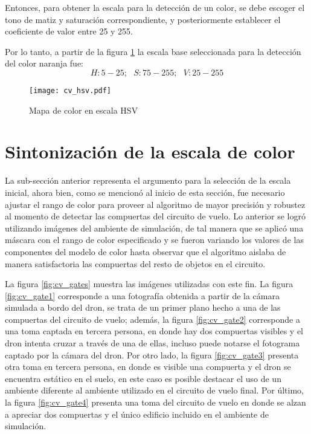 Entonces, para obtener la escala para la detección de un color, se debe escoger el tono de matiz y saturación correspondiente, y posteriormente establecer el coeficiente de valor entre 25 y 255.

Por lo tanto, a partir de la figura \ref{fig:cv_hsv} la escala base seleccionada para la detección del color naranja fue: \[H:5-25;\text{ } S:75-255;\text{ } V:25-255\]

\begin{figure}[ht]
    \centering
    \texttt{[image: cv\_hsv.pdf]}
    \caption{Mapa de color en escala HSV \cite{dey_2020}}
    \label{fig:cv_hsv}
\end{figure}

\section{Sintonización de la escala de color}

La sub-sección anterior representa el argumento para la selección de la escala inicial, ahora bien, como se mencionó al inicio de esta sección, fue necesario ajustar el rango de color para proveer al algoritmo de mayor precisión y robustez al momento de detectar las compuertas del circuito de vuelo. Lo anterior se logró utilizando imágenes del ambiente de simulación, de tal manera que se aplicó una máscara con el rango de color especificado y se fueron variando los valores de las componentes del modelo de color hasta observar que el algoritmo aislaba de manera satisfactoria las compuertas del resto de objetos en el circuito. 

La figura \ref{fig:cv_gates} muestra las imágenes utilizadas con este fin. La figura \ref{fig:cv_gate1} corresponde a una fotografía obtenida a partir de la cámara simulada a bordo del dron, se trata de un primer plano hecho a una de las compuertas del circuito de vuelo; además, la figura \ref{fig:cv_gate2} corresponde a una toma captada en tercera persona, en donde hay dos compuertas visibles y el dron intenta cruzar a través de una de ellas, incluso puede notarse el fotograma captado por la cámara del dron. Por otro lado, la figura \ref{fig:cv_gate3} presenta otra toma en tercera persona, en donde es visible una compuerta y el dron se encuentra estático en el suelo, en este caso es posible destacar el uso de un ambiente diferente al ambiente utilizado en el circuito de vuelo final. Por último, la figura \ref{fig:cv_gate4} presenta una toma del circuito de vuelo en donde se alzan a apreciar dos compuertas y el único edificio incluido en el ambiente de simulación. 

